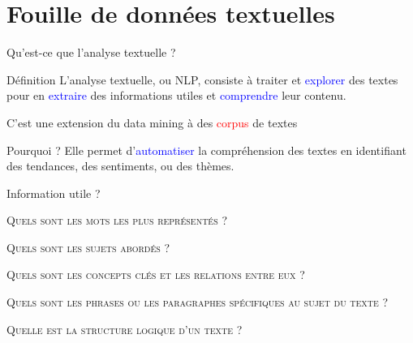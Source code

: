 \section{Fouille de données textuelles}


\begin{frame}{Qu'est-ce que l'analyse textuelle ?}

    \begin{block}{Définition}
        \medskip
        L'analyse textuelle, ou NLP, consiste à traiter et \textcolor{blue}{explorer} des textes pour en \textcolor{blue}{extraire} des informations utiles et \textcolor{blue}{comprendre} leur contenu.

        C'est une extension du data mining à des \textcolor{red}{corpus} de textes
    \end{block}
    
    \begin{block}{Pourquoi ?}
        \medskip
        Elle permet d'\textcolor{blue}{automatiser} la compréhension des textes en identifiant des tendances, des sentiments, ou des thèmes.
    \end{block}

\end{frame}

\begin{frame}{Information utile ?}

     \textsc{Quels sont les mots les plus représentés ?}
    \medskip

     \textsc{Quels sont les sujets abordés ?}
    \medskip
    
     \textsc{Quels sont les concepts clés et les relations entre eux ?}
    \medskip
    
     \textsc{Quels sont les phrases ou les paragraphes spécifiques au sujet du texte ?}
    \medskip

     \textsc{Quelle est la structure logique d'un texte ?}

\end{frame}



